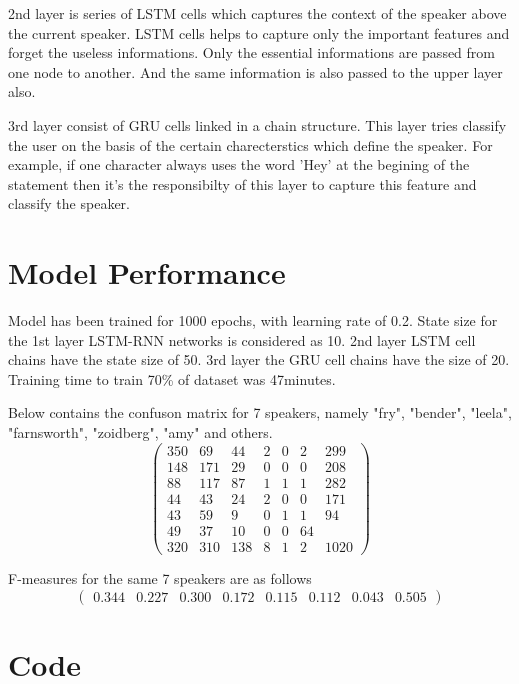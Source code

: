 \documentclass[BTech]{srmuthesis}
\begin{document}
2nd layer is series of LSTM cells which captures the context of the speaker above the current speaker. LSTM cells helps to capture only the important features and forget the useless informations. Only the essential informations are passed from one node to another. And the same information is also passed to the upper layer also. 

3rd layer consist of GRU cells linked in a chain structure. This layer tries classify the user on the basis of the certain charecterstics which define the speaker. For example, if one character always uses the word 'Hey' at the begining of the statement then it's the responsibilty of this layer to capture this feature and classify the speaker.

\section{Model Performance}

Model has been trained for 1000 epochs, with learning rate of 0.2. State size for the 1st layer LSTM-RNN networks is considered as 10. 2nd layer LSTM cell chains have the state size of 50. 3rd layer the GRU cell chains have the size of 20. Training time to train 70\% of dataset was 47minutes.


Below contains the confuson matrix for 7 speakers, namely "fry", "bender", "leela", "farnsworth", "zoidberg", "amy" and others. 
$$\begin{pmatrix}
350&69&44&2&0&2&299\\
148&171&29&0&0&0&208\\
88&117&87&1&1&1&282\\
44&43&24&2&0&0&171\\
43&59&9&0 &1&1&94\\
49&37&10&0& 0&64\\
320&310&138&8&1&2&1020
\end{pmatrix}$$

F-measures for the same 7 speakers are as follows
$$\begin{pmatrix}
0.344&0.227&0.300&0.172&0.115&0.112&0.043&0.505
\end{pmatrix}$$


\section{Code}
\end{document}
